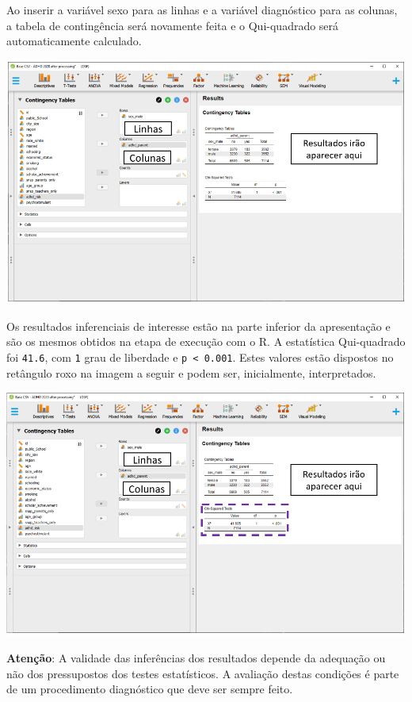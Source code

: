 \documentclass[
]{book}
\newenvironment{warning}{
  \definecolor{shadecolor}{rgb}{0, 0, 0}  %
  \color{white}
  \begin{shaded}}
 {\end{shaded}}
\begin{document}
Ao inserir a variável sexo para as linhas e a variável diagnóstico para as colunas, a tabela de contingência será novamente feita e o Qui-quadrado será automaticamente calculado.

\includegraphics{./img/cap_x2_resultados.png}

Os resultados inferenciais de interesse estão na parte inferior da apresentação e são os mesmos obtidos na etapa de execução com o R. A estatística Qui-quadrado foi \texttt{41.6}, com \texttt{1} grau de liberdade e \texttt{p\ \textless{}\ 0.001}. Estes valores estão dispostos no retângulo roxo na imagem a seguir e podem ser, inicialmente, interpretados.

\includegraphics{./img/cap_x2_resultados2.png}

\begin{warning}

\textbf{Atenção}: A validade das inferências dos resultados depende da adequação ou não dos pressupostos dos testes estatísticos. A avaliação destas condições é parte de um procedimento diagnóstico que deve ser sempre feito.

\end{warning}
\end{document}
